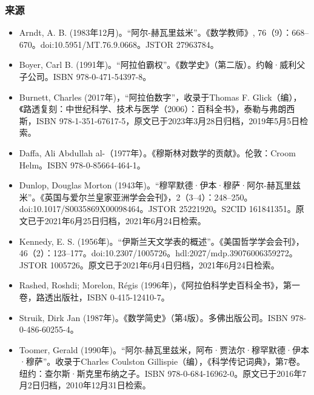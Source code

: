\subsubsection{来源}  
\begin{itemize}
\item Arndt, A. B. (1983年12月)。“阿尔-赫瓦里兹米”。《数学教师》, 76（9）：668–670。doi:10.5951/MT.76.9.0668。JSTOR 27963784。  
\item Boyer, Carl B. (1991年)。“阿拉伯霸权”。《数学史》（第二版）。约翰·威利父子公司。ISBN 978-0-471-54397-8。  
\item Burnett, Charles (2017年)，“阿拉伯数字”，收录于Thomas F. Glick（编），《路透复刻：中世纪科学、技术与医学（2006）：百科全书》，泰勒与弗朗西斯，ISBN 978-1-351-67617-5，原文已于2023年3月28日归档，2019年5月5日检索。  
\item Daffa, Ali Abdullah al-（1977年）。《穆斯林对数学的贡献》。伦敦：Croom Helm。ISBN 978-0-85664-464-1。  
\item Dunlop, Douglas Morton (1943年)。“穆罕默德·伊本·穆萨·阿尔-赫瓦里兹米”。《英国与爱尔兰皇家亚洲学会会刊》，2（3–4）：248–250。doi:10.1017/S0035869X00098464。JSTOR 25221920。S2CID 161841351。原文已于2021年6月25日归档，2021年6月24日检索。  
\item Kennedy, E. S. (1956年)。“伊斯兰天文学表的概述”。《美国哲学学会会刊》，46（2）：123–177。doi:10.2307/1005726。hdl:2027/mdp.39076006359272。JSTOR 1005726。原文已于2021年6月4日归档，2021年6月24日检索。  
\item Rashed, Roshdi; Morelon, Régis (1996年)，《阿拉伯科学史百科全书》，第一卷，路透出版社，ISBN 0-415-12410-7。  
\item Struik, Dirk Jan (1987年)。《数学简史》（第4版）。多佛出版公司。ISBN 978-0-486-60255-4。  
\item Toomer, Gerald (1990年)。“阿尔-赫瓦里兹米，阿布·贾法尔·穆罕默德·伊本·穆萨”。收录于Charles Coulston Gillispie（编），《科学传记词典》，第7卷。纽约：查尔斯·斯克里布纳之子。ISBN 978-0-684-16962-0。原文已于2016年7月2日归档，2010年12月31日检索。
\end{itemize}